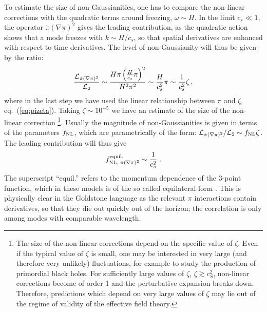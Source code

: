 \documentclass[12pt,letterpaper]{article}
\begin{document}
{To estimate the size of non-Gaussianities, one has to compare
the non-linear corrections with the quadratic terms around freezing, $\omega \sim H$. 
In the limit
$c_s\ll 1$, the operator $\dot\pi(\nabla{\pi})^2$ gives the leading
contribution, as the quadratic action shows that a mode freezes with $k
\sim H/c_s$, so that spatial derivatives are enhanced with respect to
time derivatives. The level of non-Gaussianity will thus be given by the
ratio:
\begin{equation}
\frac{{\cal L}_{\dot\pi(\nabla \pi)^2}}{{\cal L}_{2}}\sim \frac{H
\pi \left(\frac{H}{c_s} \pi\right)^2}{H^2 \pi^2} \sim \frac{H}{c^2_s}
\pi \sim \frac{1}{c^2_s} \zeta \, ,
\end{equation}
where in the last step we have used the linear relationship
between $\pi$ and $\zeta$, eq.~(\ref{eq:pizeta}). Taking $\zeta \sim
10^{-5}$ we have an estimate of the size of the non-linear correction
\footnote{The size of the non-linear corrections depend on the
  specific value of $\zeta$. Even if the typical value of
  $\zeta$ is small, one may be interested in very
large (and therefore very unlikely) fluctuations, for example to study
the production of primordial black holes. For sufficiently large
values of $\zeta$, $\zeta \gtrsim c_S^2$, non-linear corrections become
of order 1 and the perturbative expansion
breaks down. Therefore, predictions which depend on very large values
of $\zeta$ may lie out of the regime of validity of the effective
field theory.}. 
Usually the
magnitude of non-Gaussianities is given in terms of the parameters $f_{\rm
NL}$, which are parametrically of the form: ${\cal L}_{\dot\pi(\nabla
\pi)^2}/{\cal L}_2\sim f_{\rm NL} \zeta$. The leading contribution
will thus give 
\begin{equation}
\label{eq:nabla2dot}
f^{\rm equil.}_{\rm NL, \;\dot\pi(\nabla\pi)^2}\sim \frac{1}{c^2_s} \;.
\end{equation}
The superscript ``equil.'' refers to the momentum dependence of the
3-point function, which in these models is of the so called equilateral form
\cite{Babich:2004gb}. This is physically clear in the Goldstone
language as the relevant $\pi$ interactions contain derivatives, so
that they die out quickly out of the horizon; the correlation is only
among modes with comparable wavelength.


}
\end{document}
